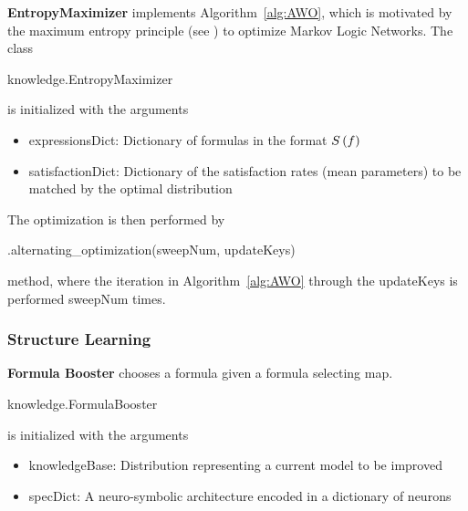 \textbf{EntropyMaximizer} implements Algorithm~\ref{alg:AWO}, which is motivated by the maximum entropy principle (see ) to optimize Markov Logic Networks.
The class  
\begin{centeredcode}
	knowledge.EntropyMaximizer
\end{centeredcode}
is initialized with the arguments
\begin{itemize}
	\item expressionsDict: Dictionary of formulas in the format $S\left(f\right)$ 
	\item satisfactionDict: Dictionary of the satisfaction rates (mean parameters) to be matched by the optimal distribution
\end{itemize}
The optimization is then performed by
\begin{centeredcode}
	.alternating\_optimization(sweepNum, updateKeys)
\end{centeredcode}
method, where the iteration in Algorithm~\ref{alg:AWO} through the updateKeys is performed sweepNum times.

\subsubsection{Structure Learning}

\textbf{Formula Booster} chooses a formula given a formula selecting map.
\begin{centeredcode}
	knowledge.FormulaBooster
\end{centeredcode}
is initialized with the arguments
\begin{itemize}
	\item knowledgeBase: Distribution representing a current model to be improved
	\item specDict: A neuro-symbolic architecture encoded in a dictionary of neurons
\end{itemize}


